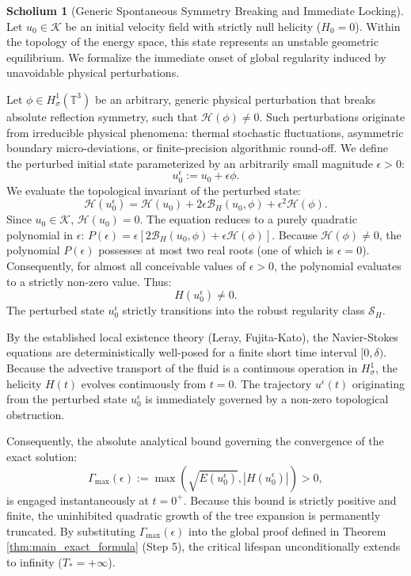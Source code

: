 \documentclass[12pt,a4paper]{article}
\theoremstyle{plain}
\theoremstyle{definition}
\newtheorem{scholium}[theorem]{Scholium}
\theoremstyle{remark}
\newcommand{\T}{\mathbb{T}}
\begin{document}
\begin{scholium}[Generic Spontaneous Symmetry Breaking and Immediate Locking]
\label{sch:symmetry_breaking_dynamic}
Let $u_0 \in \mathcal{K}$ be an initial velocity field with strictly null helicity ($H_0 = 0$). Within the topology of the energy space, this state represents an unstable geometric equilibrium. We formalize the immediate onset of global regularity induced by unavoidable physical perturbations.

Let $\phi \in H^1_\sigma(\T^3)$ be an arbitrary, generic physical perturbation that breaks absolute reflection symmetry, such that $\mathcal{H}(\phi) \neq 0$. Such perturbations originate from irreducible physical phenomena: thermal stochastic fluctuations, asymmetric boundary micro-deviations, or finite-precision algorithmic round-off. We define the perturbed initial state parameterized by an arbitrarily small magnitude $\epsilon > 0$:
\[
  u_0^\epsilon := u_0 + \epsilon \phi.
\]
We evaluate the topological invariant of the perturbed state:
\[
  \mathcal{H}(u_0^\epsilon) = \mathcal{H}(u_0) + 2\epsilon \mathcal{B}_H(u_0, \phi) + \epsilon^2 \mathcal{H}(\phi).
\]
Since $u_0 \in \mathcal{K}$, $\mathcal{H}(u_0) = 0$. The equation reduces to a purely quadratic polynomial in $\epsilon$: $P(\epsilon) = \epsilon [2\mathcal{B}_H(u_0, \phi) + \epsilon \mathcal{H}(\phi)]$. Because $\mathcal{H}(\phi) \neq 0$, the polynomial $P(\epsilon)$ possesses at most two real roots (one of which is $\epsilon = 0$). Consequently, for almost all conceivable values of $\epsilon > 0$, the polynomial evaluates to a strictly non-zero value. Thus:
\[
  H(u_0^\epsilon) \neq 0.
\]
The perturbed state $u_0^\epsilon$ strictly transitions into the robust regularity class $\mathcal{S}_H$. 

By the established local existence theory (Leray, Fujita-Kato), the Navier-Stokes equations are deterministically well-posed for a finite short time interval $[0, \delta)$. Because the advective transport of the fluid is a continuous operation in $H^1_\sigma$, the helicity $H(t)$ evolves continuously from $t=0$. The trajectory $u^\epsilon(t)$ originating from the perturbed state $u_0^\epsilon$ is immediately governed by a non-zero topological obstruction. 

Consequently, the absolute analytical bound governing the convergence of the exact solution:
\[
  \Gamma_{\max}(\epsilon) := \max\left(\sqrt{E(u_0^\epsilon)}, |H(u_0^\epsilon)|\right) > 0,
\]
is engaged instantaneously at $t = 0^+$. Because this bound is strictly positive and finite, the uninhibited quadratic growth of the tree expansion is permanently truncated. By substituting $\Gamma_{\max}(\epsilon)$ into the global proof defined in Theorem \ref{thm:main_exact_formula} (Step 5), the critical lifespan unconditionally extends to infinity ($T_* = +\infty$).


\end{scholium}
\end{document}
